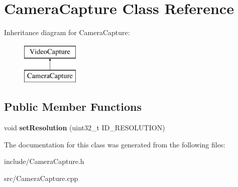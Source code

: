\hypertarget{classCameraCapture}{\section{Camera\-Capture Class Reference}
\label{classCameraCapture}
}
Inheritance diagram for Camera\-Capture\-:\begin{figure}[H]
\begin{center}
\leavevmode
\includegraphics[height=2.000000cm]{classCameraCapture}
\end{center}
\end{figure}
\subsection*{Public Member Functions}
\begin{DoxyCompactItemize}
\item 
\hypertarget{classCameraCapture_a91c991b748f6206c84f50f5f0840532e}{void {\bfseries set\-Resolution} (uint32\-\_\-t I\-D\-\_\-\-R\-E\-S\-O\-L\-U\-T\-I\-O\-N)}\label{classCameraCapture_a91c991b748f6206c84f50f5f0840532e}

\end{DoxyCompactItemize}


The documentation for this class was generated from the following files\-:\begin{DoxyCompactItemize}
\item 
include/Camera\-Capture.\-h\item 
src/Camera\-Capture.\-cpp\end{DoxyCompactItemize}

